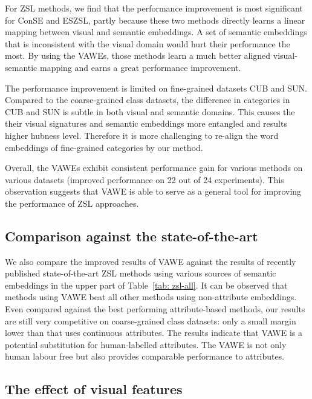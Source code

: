 \documentclass{bmvc2k}
\begin{document}
For ZSL methods, we find that the performance improvement is most significant for ConSE and ESZSL, partly because these two methods directly learns a linear mapping between visual and semantic embeddings. A set of semantic embeddings that is inconsistent with the visual domain would hurt their performance the most. By using the VAWEs, those methods learn a much better aligned visual-semantic mapping and earns a great performance improvement. %

The performance improvement is limited on fine-grained datasets CUB and SUN. Compared to the coarse-grained class datasets, the difference in categories in CUB and SUN is subtle in both visual and semantic domains. This causes the their visual signatures and semantic embeddings more entangled and results higher hubness level. Therefore it is more challenging to re-align the word embeddings of fine-grained categories by our method.

Overall, the VAWEs exhibit consistent performance gain for various methods on various datasets (improved performance on 22 out of 24 experiments). This observation suggests that VAWE is able to serve as a general tool for improving the performance of ZSL approaches.

\subsection{Comparison against the state-of-the-art}
We also compare the improved results of VAWE against the results of recently published state-of-the-art ZSL methods using various sources of semantic embeddings in the upper part of Table~\ref{tab: zsl-all}. It can be observed that methods using VAWE beat all other methods using non-attribute embeddings. Even compared against the best performing attribute-based methods, our results are still very competitive on coarse-grained class datasets: only a small margin lower than \cite{Zhang2016CVPR} that uses continuous attributes. The results indicate that VAWE is a potential substitution for human-labelled attributes. The VAWE is not only human labour free but also provides comparable performance to attributes.




\subsection{The effect of visual features}
\end{document}
